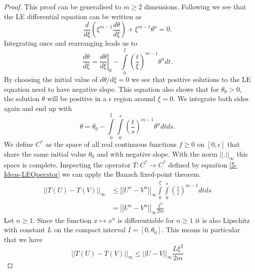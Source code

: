 \begin{proof}
	This proof can be generalised to $m\geq2$ dimensions. 
	Following \cite{quittnerSuperlinearParabolicProblems2007a} we see that the LE differential equation can be written as
	\begin{equation}
		\frac{d}{d\xi}\left(\xi^{m-1}\frac{d\theta}{d\xi}\right) + \xi^{m-1}\theta^n = 0.
	\end{equation}
	Integrating once and rearranging leads us to
	\begin{equation}
		\frac{d\theta}{d\xi} = \left.\frac{d\theta}{d\xi}\right|_0 - \int\limits_0^\xi\left(\frac{t}{\xi}\right)^{m-1}\theta^ndt.
	\end{equation}
	By choosing the initial value of $d\theta/d\xi=0$ we see that positive solutions to the LE equation need to have negative slope.
	This equation also shows that for $\theta_0>0$, the solution $\theta$ will be positive in a $\epsilon$ region around $\xi=0$.
	We integrate both sides again and end up with
	\begin{equation}
		\theta = \theta_0 - \int\limits_0^\xi\int\limits_0^s\left(\frac{t}{s}\right)^{m-1}\theta^ndtds.
		\label{5-Ideas-LEOperator}
	\end{equation}
	We define $C^*$ as the space of all real continuous functions $f\geq0$ on $[0,\epsilon]$ that share the same initial value $\theta_0$ and with negative slope. %
	With the norm $||.||_\infty$ this space is complete.
	Inspecting the operator $T:C^*\rightarrow C^*$ defined by
	equation \ref{5-Ideas-LEOperator} we can apply the Banach fixed-point theorem.
	\begin{align}
		||T(U)-T(V)||_\infty	&\leq	\left|\left|U^n-V^n\right|\right|_\infty\int\limits_0^\xi\int\limits_0^s \left(\frac{t}{s}\right)^{m-1}dtds\\
								&=		\left|\left|U^n-V^n\right|\right|_\infty\frac{\xi^2}{2m}
	\end{align}
	Let $n\geq1$. 
	Since the function $x\mapsto x^n$ is differentiable for $n\geq1$ it is also Lipschitz with constant $L$ on the compact interval $I=[0,\theta_0]$.
	This means in particular that we have
	\begin{equation}
		||T(U)-T(V)||_\infty	\leq	\left|\left|U-V\right|\right|_\infty\frac{L\xi^2}{2m}
	\end{equation}

\end{proof}
